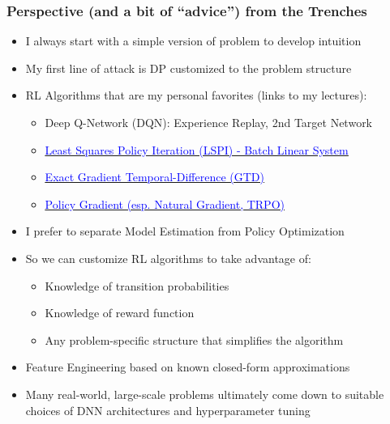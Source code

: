 \documentclass[handout]{beamer}
\begin{document}
\begin{frame}
\frametitle{Perspective (and a bit of ``advice'') from the Trenches}
\pause
\begin{itemize}
\item I always start with a simple version of problem to develop intuition
\pause
\item My first line of attack is DP customized to the problem structure
\pause
\item RL Algorithms that are my personal favorites (links to my lectures):
\begin{itemize}
\item Deep Q-Network (DQN): Experience Replay, 2nd Target Network
\item \href{https://github.com/coverdrive/technical-documents/blob/master/finance/cme241/ValueFunctionGeometry.pdf}{\underline{\textcolor{blue}{Least Squares Policy Iteration (LSPI) - Batch Linear System}}}
\item \href {https://github.com/coverdrive/technical-documents/blob/master/finance/cme241/ValueFunctionGeometry.pdf}{\underline{\textcolor{blue}{Exact Gradient Temporal-Difference (GTD)}}}
\item \href{https://github.com/coverdrive/technical-documents/blob/master/finance/cme241/PolicyGradient.pdf}{\underline{\textcolor{blue}{Policy Gradient (esp. Natural Gradient, TRPO)}}}
\end{itemize}
\pause
\item I prefer to separate Model Estimation from Policy Optimization
\pause
\item So we can customize RL algorithms to take advantage of:
\begin{itemize}
\item Knowledge of transition probabilities
\item Knowledge of reward function
\item Any problem-specific structure that simplifies the algorithm
\end{itemize}
\pause
\item Feature Engineering based on known closed-form approximations
\pause
\item Many real-world, large-scale problems ultimately come down to
suitable choices of DNN architectures and hyperparameter tuning \frownie
\end{itemize}
\end{frame}
\end{document}
